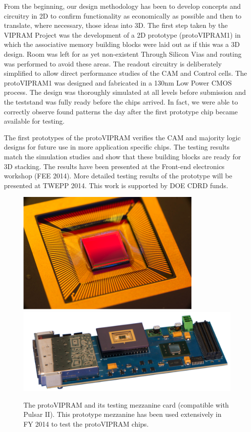 From the beginning, our design methodology has been to develop concepts and circuitry in 2D to confirm functionality as economically as possible and then to translate, where necessary, those ideas into 3D.  The first step taken by the VIPRAM Project was the development of a 2D prototype (protoVIPRAM1) in which the associative memory building blocks were laid out as if this was a 3D design.  Room was left for as yet non-existent Through Silicon Vias and routing was performed to avoid these areas.  
The readout circuitry is deliberately simplified to allow direct performance studies of the CAM and Control cells.  The protoVIPRAM1 was designed and fabricated in a 130nm Low Power CMOS process.  The design was thoroughly simulated at all levels before submission and the teststand was fully ready before the chips arrived. In fact, we were able to correctly observe found patterns the day after the first prototype chip became available for testing. 

The first prototypes of the protoVIPRAM verifies the CAM and majority logic designs for future use in more application specific chips. The testing results match the simulation studies and show that these building blocks are ready for 3D stacking.  The results have been presented at the Front-end electronics workshop (FEE 2014).  More detailed testing results of the prototype will be presented at TWEPP 2014. This work is supported by DOE CDRD funds.


\begin{figure}[ht!]
\centering
\includegraphics[width=0.3\columnwidth]{Plots/ProtoVIPRAM-photo.png}
\includegraphics[width=0.6\columnwidth]{Plots/ProtoVIPRAM-mezzanine.png}
\caption{The protoVIPRAM and its testing mezzanine card (compatible with Pulsar II). This prototype mezzanine has been used extensively in FY 2014 to test the protoVIPRAM chips.}
\label{fig:ProtoVIPRAM}
\end{figure}


